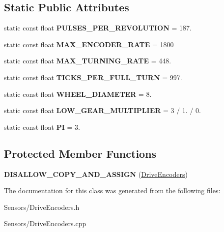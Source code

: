 \subsection*{\-Static \-Public \-Attributes}
\begin{DoxyCompactItemize}
\item 
\hypertarget{class_drive_encoders_a829f3cc0da7ee92baae235cfc9c1f160}{
static const float {\bfseries \-P\-U\-L\-S\-E\-S\-\_\-\-P\-E\-R\-\_\-\-R\-E\-V\-O\-L\-U\-T\-I\-O\-N} = 187.}
\label{class_drive_encoders_a829f3cc0da7ee92baae235cfc9c1f160}

\item 
\hypertarget{class_drive_encoders_ae62d6c233c5da05244aa37b9502559d7}{
static const float {\bfseries \-M\-A\-X\-\_\-\-E\-N\-C\-O\-D\-E\-R\-\_\-\-R\-A\-T\-E} = 1800}
\label{class_drive_encoders_ae62d6c233c5da05244aa37b9502559d7}

\item 
\hypertarget{class_drive_encoders_a1a0785c361f779ed00bf79a26f4f619a}{
static const float {\bfseries \-M\-A\-X\-\_\-\-T\-U\-R\-N\-I\-N\-G\-\_\-\-R\-A\-T\-E} = 448.}
\label{class_drive_encoders_a1a0785c361f779ed00bf79a26f4f619a}

\item 
\hypertarget{class_drive_encoders_a373c1bbc71d509e70ad78021233a1429}{
static const float {\bfseries \-T\-I\-C\-K\-S\-\_\-\-P\-E\-R\-\_\-\-F\-U\-L\-L\-\_\-\-T\-U\-R\-N} = 997.}
\label{class_drive_encoders_a373c1bbc71d509e70ad78021233a1429}

\item 
\hypertarget{class_drive_encoders_afa6a37dede0d3f61bf41a13a3d17be24}{
static const float {\bfseries \-W\-H\-E\-E\-L\-\_\-\-D\-I\-A\-M\-E\-T\-E\-R} = 8.}
\label{class_drive_encoders_afa6a37dede0d3f61bf41a13a3d17be24}

\item 
\hypertarget{class_drive_encoders_a1de7e12eed8a37ecffc31efb7fa2223a}{
static const float {\bfseries \-L\-O\-W\-\_\-\-G\-E\-A\-R\-\_\-\-M\-U\-L\-T\-I\-P\-L\-I\-E\-R} = 3 / 1. / 0.}
\label{class_drive_encoders_a1de7e12eed8a37ecffc31efb7fa2223a}

\item 
\hypertarget{class_drive_encoders_a1cea9fe05f04e85d2f7ec72151509c38}{
static const float {\bfseries \-P\-I} = 3.}
\label{class_drive_encoders_a1cea9fe05f04e85d2f7ec72151509c38}

\end{DoxyCompactItemize}
\subsection*{\-Protected \-Member \-Functions}
\begin{DoxyCompactItemize}
\item 
\hypertarget{class_drive_encoders_a815f7c5d2f74e9ffa300fa8a32a1bd85}{
{\bfseries \-D\-I\-S\-A\-L\-L\-O\-W\-\_\-\-C\-O\-P\-Y\-\_\-\-A\-N\-D\-\_\-\-A\-S\-S\-I\-G\-N} (\hyperlink{class_drive_encoders}{\-Drive\-Encoders})}
\label{class_drive_encoders_a815f7c5d2f74e9ffa300fa8a32a1bd85}

\end{DoxyCompactItemize}


\-The documentation for this class was generated from the following files\-:\begin{DoxyCompactItemize}
\item 
\-Sensors/\-Drive\-Encoders.\-h\item 
\-Sensors/\-Drive\-Encoders.\-cpp\end{DoxyCompactItemize}
